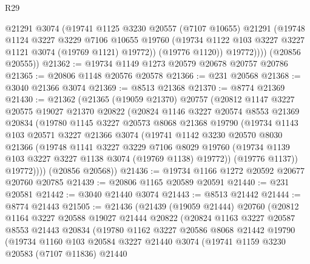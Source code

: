 \begin{lexlean}{R29}
\begin{coremodule}
              @21291
              @3074
              (@19741
                @1125
                @3230
                @20557
                (@7107 @10655)
                @21291
                (@19748
                  @1124
                  @3227
                  @3229
                  @7106
                  @10655
                  @19760
                  (@19734 @1122 @103 @3227 @3227 @1121 @3074 (@19769 @1121) @19772))
                (@19776 @1120))
              @19772))))
      (@20856 @20555))
@21362 := @19734 @1149 @1273 @20579 @20678 @20757 @20786
@21365 := @20806 @1148 @20576 @20578
@21366 := @231 @20568
@21368 := @3040 @21366 @3074
@21369 := @8513 @21368
@21370 := @8774 @21369
@21430 := @21362
    (@21365
      (@19059 @21370)
      @20757
      (@20812
        @1147
        @3227
        @20575
        @19027
        @21370
        @20822
        (@20824
          @1146
          @3227
          @20574
          @8553
          @21369
          @20834
          (@19780
            @1145
            @3227
            @20573
            @8068
            @21368
            @19790
            (@19734
              @1143
              @103
              @20571
              @3227
              @21366
              @3074
              (@19741
                @1142
                @3230
                @20570
                @8030
                @21366
                (@19748
                  @1141
                  @3227
                  @3229
                  @7106
                  @8029
                  @19760
                  (@19734 @1139 @103 @3227 @3227 @1138 @3074 (@19769 @1138) @19772))
                (@19776 @1137))
              @19772))))
      (@20856 @20568))
@21436 := @19734 @1166 @1272 @20592 @20677 @20760 @20785
@21439 := @20806 @1165 @20589 @20591
@21440 := @231 @20581
@21442 := @3040 @21440 @3074
@21443 := @8513 @21442
@21444 := @8774 @21443
@21505 := @21436
    (@21439
      (@19059 @21444)
      @20760
      (@20812
        @1164
        @3227
        @20588
        @19027
        @21444
        @20822
        (@20824
          @1163
          @3227
          @20587
          @8553
          @21443
          @20834
          (@19780
            @1162
            @3227
            @20586
            @8068
            @21442
            @19790
            (@19734
              @1160
              @103
              @20584
              @3227
              @21440
              @3074
              (@19741
                @1159
                @3230
                @20583
                (@7107 @11836)
                @21440

\end{coremodule}
\end{lexlean}
